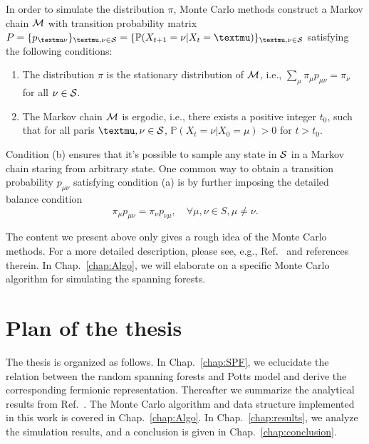 In order to simulate the distribution $\pi$, Monte Carlo methods construct a Markov chain ${\mathcal M}$ with transition probability matrix 
$P = \{p_{\mu\nu}\}_{\mu, \nu \in \scrS} = \{\mathbb{P}(X_{t+1} = \nu|X_{t} = \mu)\}_{\mu, \nu\in \scrS}$ satisfying the following conditions:
\begin{enumerate}[label=(\alph*)]
	\item The distribution $\pi$ is the stationary distribution of ${\mathcal M}$, i.e.,  $\sum_\mu \pi_{\mu} p_{\mu\nu} = \pi_\nu$ for all $\nu\in {\mathcal S}$.
	\item The Markov chain ${\mathcal M}$ is ergodic, i.e., there exists a positive integer $t_0$, such that for all paris $\mu, \nu\in \scrS$, 
	$\mathbb{P}(X_t = \nu|X_0 = \mu) > 0$ for $t > t_0$.
\end{enumerate}
Condition (b) ensures that it's possible to sample any state in ${\mathcal S}$ in a Markov chain staring from arbitrary state.
One common way to obtain a transition probability $p_{\mu\nu}$ satisfying condition (a) is by further imposing the detailed balance condition
\begin{equation}
	\pi_{\mu} p_{\mu\nu} = \pi_{\nu} p_{\nu \mu}, \quad \forall \mu, \nu \in S, \mu \neq \nu.
\end{equation}

The content we present above only gives a rough idea of the Monte Carlo methods. For a more detailed description, please see, e.g., Ref.~ and references therein.
In Chap.~\ref{chap:Algo}, we will elaborate on a specific Monte Carlo algorithm for simulating the spanning forests.

\section{Plan of the thesis}
The thesis is organized as follows. In Chap.~\ref{chap:SPF}, we eclucidate the relation between the random spanning forests and
Potts model and derive the corresponding fermionic representation. Thereafter we summarize the analytical results from Ref.~.
The Monte Carlo algorithm and data structure implemented in this work is covered in Chap.~\ref{chap:Algo}. In Chap.~\ref{chap:results}, we analyze the simulation results, and a conclusion is given in Chap.~\ref{chap:conclusion}.


